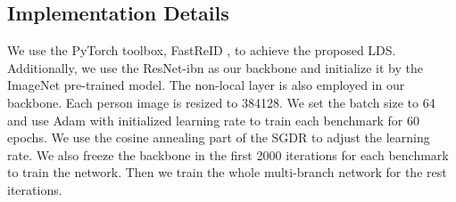 \documentclass[a4paper]{cas-dc}
\begin{document}
\subsection{Implementation Details}
We use the PyTorch toolbox, FastReID \cite{RN489}, to achieve the proposed LDS. Additionally, we use the ResNet-ibn \cite{RN73} \cite{RN490} as our backbone and initialize it by the ImageNet \cite{RN396} pre-trained model. The non-local layer \cite{RN161} is also employed in our backbone. Each person image is resized to 384128. We set the batch size to 64 and use Adam \cite{RN511} with initialized learning rate  to train each benchmark for 60 epochs. We use the cosine annealing part of the SGDR \cite{RN512} to adjust the learning rate. We also freeze the backbone in the first 2000 iterations for each benchmark to train the network. Then we train the whole multi-branch network for the rest iterations. 
\end{document}
